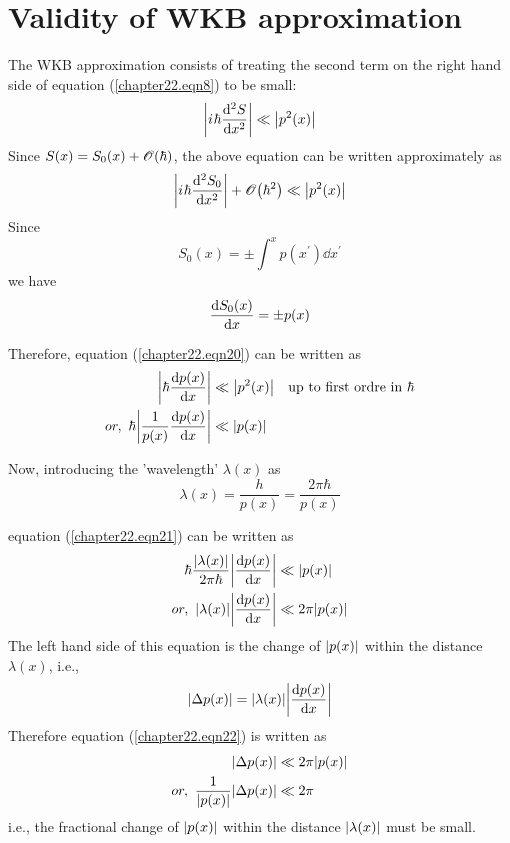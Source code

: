 \section{Validity of WKB approximation}
The WKB approximation consists of treating the second term on the right hand side of equation (\ref{chapter22.eqn8}) to be small:
\begin{equation}
\label{chapter22.eqn19}
\abs{{i\mkern1mu} \hbar \dv[2]{S}{x}} \ll \abs{p^2(x)}
\end{equation}
Since $S(x) = S_0(x) + \order{\hbar}$, the above equation can be written approximately as
\begin{equation}
\label{chapter22.eqn20}
\abs{\iu \hbar \dv[2]{S_0}{x}} + \order{\hbar^2} \ll \abs{p^2(x)}
\end{equation}
Since
\begin{equation}
S_0(x) = \pm \int^{x} p(x^\prime) \dd{x^\prime}
\end{equation}
we have
\begin{equation}
\dv{S_0(x)}{x} = \pm p(x)
\end{equation}

Therefore, equation (\ref{chapter22.eqn20}) can be written as
\begin{align}
\abs{\hbar\dv{p(x)}{x}} &\ll \abs{p^2(x)} \quad \text{up to first ordre in } \hbar \nonumber \\
\label{chapter22.eqn21}
or, \ \hbar \abs{\frac{1}{p(x)} \dv{p(x)}{x}} &\ll  \abs{p(x)}
\end{align}

Now, introducing the 'wavelength' $\lambda(x)$ as 
\begin{equation}
\lambda(x) = \frac{h}{p(x)} = \frac{2\pi \hbar}{p(x)}
\end{equation}

equation (\ref{chapter22.eqn21}) can be written as
\begin{align}
\hbar \frac{\abs{\lambda(x)}}{2 \pi \hbar} \abs{\dv{p(x)}{x}} &\ll \abs{p(x)} \nonumber \\
\label{chapter22.eqn22}
or, \ \abs{\lambda(x)} \abs{\dv{p(x)}{x}} &\ll 2 \pi \abs{p(x)}
\end{align}
The left hand side of this equation is the change of $\abs{p(x)}$ within the distance $\lambda(x)$, i.e.,
\begin{equation*}
\abs{\Delta p(x)} = \abs{\lambda(x)} \abs{\dv{p(x)}{x}}
\end{equation*}
Therefore equation (\ref{chapter22.eqn22}) is written as
\begin{align}
	\abs{\Delta p(x)} &\ll 2\pi \abs{p(x)} \nonumber \\
	\label{chapter22.eqn23}
	or, \ \frac{1}{\abs{p(x)}} \abs{\Delta p(x)} &\ll 2 \pi
\end{align}
i.e., the fractional change of $\abs{p(x)}$ within the distance $\abs{\lambda(x)}$ must be small.

